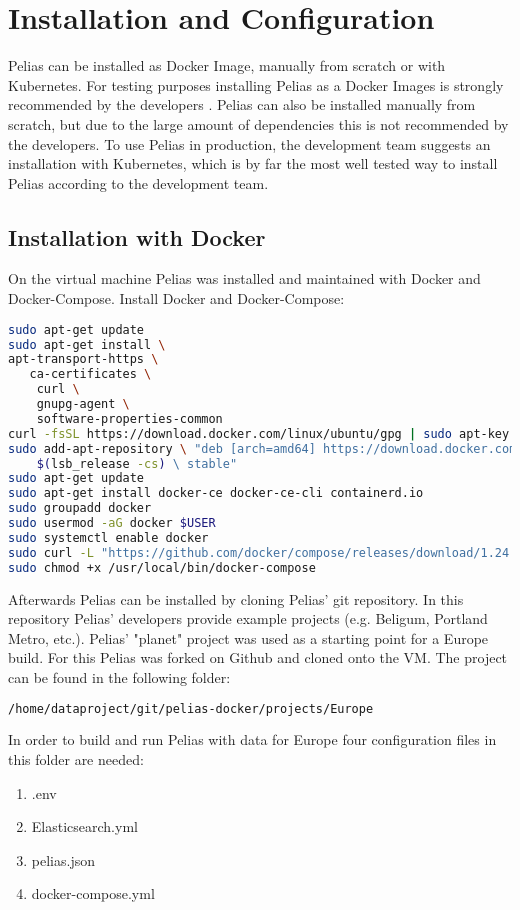 \section{Installation and Configuration}
Pelias can be installed as Docker Image, manually from scratch or with Kubernetes. For testing purposes installing Pelias as a Docker Images is strongly recommended by the developers \cite{Simioni2018b}. Pelias can also be installed manually from scratch, but due to the large amount of dependencies this is not recommended by the developers. To use Pelias in production, the development team suggests an installation with Kubernetes, which is by far the most well tested way to install Pelias according to the development team.

\subsection{Installation with Docker}
On the virtual machine Pelias was installed and maintained with Docker and Docker-Compose. Install Docker and Docker-Compose:
\begin{lstlisting}[language=bash,breaklines=true]
sudo apt-get update
sudo apt-get install \
apt-transport-https \
   ca-certificates \
	curl \
	gnupg-agent \
	software-properties-common
curl -fsSL https://download.docker.com/linux/ubuntu/gpg | sudo apt-key add -
sudo add-apt-repository \ "deb [arch=amd64] https://download.docker.com/linux/ubuntu \
	$(lsb_release -cs) \ stable"
sudo apt-get update
sudo apt-get install docker-ce docker-ce-cli containerd.io
sudo groupadd docker
sudo usermod -aG docker $USER
sudo systemctl enable docker
sudo curl -L "https://github.com/docker/compose/releases/download/1.24.0/docker-compose-$(uname -s)-$(uname -m)" -o /usr/local/bin/docker-compose
sudo chmod +x /usr/local/bin/docker-compose
\end{lstlisting}
Afterwards Pelias can be installed by cloning Pelias' git repository. In this repository Pelias' developers provide example projects (e.g. Beligum, Portland Metro, etc.). Pelias' "planet" project was used as a starting point for a Europe build. For this Pelias was forked on Github and cloned onto the VM. The project can be found in the following folder:
\begin{lstlisting}[language=bash,breaklines=true]
/home/dataproject/git/pelias-docker/projects/Europe
\end{lstlisting}
In order to build and run Pelias with data for Europe four configuration files in this folder are needed:
\begin{enumerate}
\item .env
\item Elasticsearch.yml
\item pelias.json
\item docker-compose.yml
\end{enumerate}
